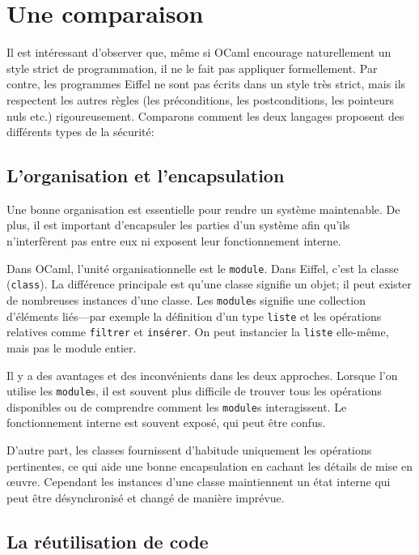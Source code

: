 \documentclass[french]{report}
\begin{document}
\chapter{Une comparaison}

Il est intéressant d'observer que, même si OCaml encourage naturellement un style strict de programmation, il ne le fait pas appliquer formellement. Par contre, les programmes Eiffel ne sont pas écrits dans un style très strict, mais ils respectent les autres règles (les préconditions, les postconditions, les pointeurs nuls etc.) rigoureusement. Comparons comment les deux langages proposent des différents types de la sécurité:

\section{L'organisation et l'encapsulation}

Une bonne organisation est essentielle pour rendre un système maintenable. De plus, il est important d'encapsuler les parties d'un système afin qu'ils n'interfèrent pas entre eux ni exposent leur fonctionnement interne.

Dans OCaml, l'unité organisationnelle est le \texttt{module}. Dans Eiffel, c'est la classe (\texttt{class}). La différence principale est qu'une classe signifie un objet; il peut exister de nombreuses instances d'une classe. Les \texttt{module}s signifie une collection d'éléments liés---par exemple la définition d'un type \texttt{liste} et les opérations relatives comme \texttt{filtrer} et \texttt{insérer}. On peut instancier la \texttt{liste} elle-même, mais pas le module entier.

Il y a des avantages et des inconvénients dans les deux approches. Lorsque l'on utilise les \texttt{module}s, il est souvent plus difficile de trouver tous les opérations disponibles ou de comprendre comment les \texttt{module}s interagissent. Le fonctionnement interne est souvent exposé, qui peut être confus.

D'autre part, les classes fournissent d'habitude uniquement les opérations pertinentes, ce qui aide une bonne encapsulation en cachant les détails de mise en œuvre. Cependant les instances d'une classe maintiennent un état interne qui peut être désynchronisé et changé de manière imprévue.

\section{La réutilisation de code}
\end{document}
